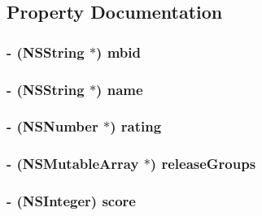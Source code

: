 \subsection{Property Documentation}
\hypertarget{interface_artist_a064ba61c840d05702f8f0972b1a2c890}{
\subsubsection[{mbid}]{\setlength{\rightskip}{0pt plus 5cm}-\/ (N\-S\-String $\ast$) {\bf mbid}}}\label{interface_artist_a064ba61c840d05702f8f0972b1a2c890}
\hypertarget{interface_artist_a3f45a6c8d6fbb2705aeb5f6f99bfdb17}{
\subsubsection[{name}]{\setlength{\rightskip}{0pt plus 5cm}-\/ (N\-S\-String $\ast$) {\bf name}}}\label{interface_artist_a3f45a6c8d6fbb2705aeb5f6f99bfdb17}
\hypertarget{interface_artist_ac51cb6516fa2fde9c5ae32ffb0f6c477}{
\subsubsection[{rating}]{\setlength{\rightskip}{0pt plus 5cm}-\/ (N\-S\-Number $\ast$) {\bf rating}}}\label{interface_artist_ac51cb6516fa2fde9c5ae32ffb0f6c477}
\hypertarget{interface_artist_ae7c9b0d52dc0453be0a79d5b32346cbf}{
\subsubsection[{release\-Groups}]{\setlength{\rightskip}{0pt plus 5cm}-\/ (N\-S\-Mutable\-Array $\ast$) {\bf release\-Groups}}}\label{interface_artist_ae7c9b0d52dc0453be0a79d5b32346cbf}
\hypertarget{interface_artist_ade673c261f25a1199f87dc68377170db}{
\subsubsection[{score}]{\setlength{\rightskip}{0pt plus 5cm}-\/ (N\-S\-Integer) {\bf score}}}\label{interface_artist_ade673c261f25a1199f87dc68377170db}
